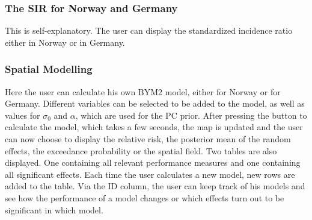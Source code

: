 \subsubsection*{The SIR for Norway and Germany}
This is self-explanatory. The user can display the standardized incidence ratio either in Norway or in Germany.
\subsubsection*{Spatial Modelling}
Here the user can calculate his own BYM2 model, either for Norway or for Germany. Different variables can be selected to be added to the model, as well as values for $\sigma_0$ and $\alpha$, which are used for the PC prior. After pressing the button to calculate the model, which takes a few seconds, the map is updated and the user can now choose to display the relative risk, the posterior mean of the random effects, the exceedance probability or the spatial field. Two tables are also displayed. One containing all relevant performance measures and one containing all significant effects. Each time the user calculates a new model, new rows are added to the table. Via the ID column, the user can keep track of his models and see how the performance of a model changes or which effects turn out to be significant in which model.
